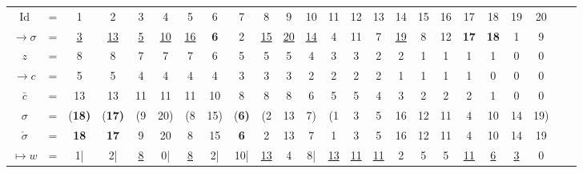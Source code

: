 \documentclass[12pt]{amsart} %
\numberwithin{equation}{section}
\theoremstyle{plain}
\theoremstyle{definition}
\def\U{\underline}
\def\B{\bf}
\begin{document}
{
\small
\setlength{\tabcolsep}{3pt}
\begin{center}
%
\begin{tabular}{c c c  c c c c c c c c c c c c c c c c c c c c c}
Id &=& 1&2&3&4&5&6&7&8&9&10&11&12&13&14&15&16&17&18&19&20 \\
$\rightarrow\sigma$ &=& {\U 3}&\U{13}&{\U 5}&\U{10}&\U{16}&{\B 6}&2& \U{15}& \U{20}& \U{14}&4&11&7& \U{19}&8&12& \B{17}& \B{18}&1&9 \\
$z $ & =& 8&8&7&7&7&6&5&5&5&4&3&3&2&2&1&1&1&1&0&0 \\
$\rightarrow c $ & =& 5&5&4&4&4&4&3&3&3&2&2&2&2&1&1&1&1&0&0&0 \\
$\bar c$ &=& 13&13&11&11&11&10&8&8&8&6&5&5&4&3&2&2&2&1&0&0 \\
$\sigma $&=& (\B{18})& (\B{17}) &(9&20)&(8&15)& (\B{6})&(2&13&7)&(1&3&5&16&12&11&4&10&14&19) \\
$\check\sigma$&=& \B{18}& \B{17}&9&20&8&15& \B{6}&2&13&7&1&3&5&16&12&11&4&10&14&19 \\
$\mapsto w$& =& 1\;|&2\;|& \U{8}&0\;|& \U{8}&2\;|&10\;|& \U{13}&4&8\;|& \U{13}& \U{11}& \U{11}&2&5&5& \U{11}& \U{6}& \U{3}&0\\
\end{tabular}
\end{center}
}
\end{document}

